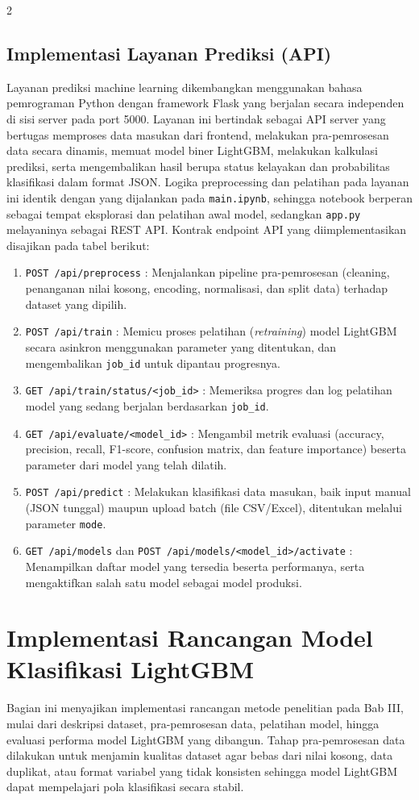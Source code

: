 \documentclass[12pt, a4paper, onecolumn, oneside]{report}
\begin{document}
\begin{spacing}{2}
\subsection{Implementasi Layanan Prediksi (API)}
Layanan prediksi machine learning dikembangkan menggunakan bahasa pemrograman Python dengan framework Flask yang berjalan secara independen di sisi server pada port 5000. Layanan ini bertindak sebagai API server yang bertugas memproses data masukan dari frontend, melakukan pra-pemrosesan data secara dinamis, memuat model biner LightGBM, melakukan kalkulasi prediksi, serta mengembalikan hasil berupa status kelayakan dan probabilitas klasifikasi dalam format JSON. Logika preprocessing dan pelatihan pada layanan ini identik dengan yang dijalankan pada \texttt{main.ipynb}, sehingga notebook berperan sebagai tempat eksplorasi dan pelatihan awal model, sedangkan \texttt{app.py} melayaninya sebagai REST API. Kontrak endpoint API yang diimplementasikan disajikan pada tabel berikut:
\begin{enumerate}
    \item \texttt{POST /api/preprocess} : Menjalankan pipeline pra-pemrosesan (cleaning, penanganan nilai kosong, encoding, normalisasi, dan split data) terhadap dataset yang dipilih.
    \item \texttt{POST /api/train} : Memicu proses pelatihan (\textit{retraining}) model LightGBM secara asinkron menggunakan parameter yang ditentukan, dan mengembalikan \texttt{job\_id} untuk dipantau progresnya.
    \item \texttt{GET /api/train/status/\allowbreak<job\_id>} : Memeriksa progres dan log pelatihan model yang sedang berjalan berdasarkan \texttt{job\_id}.
    \item \texttt{GET /api/evaluate/\allowbreak<model\_id>} : Mengambil metrik evaluasi (accuracy, precision, recall, F1-score, confusion matrix, dan feature importance) beserta parameter dari model yang telah dilatih.
    \item \texttt{POST /api/predict} : Melakukan klasifikasi data masukan, baik input manual (JSON tunggal) maupun upload batch (file CSV/Excel), ditentukan melalui parameter \texttt{mode}.
    \item \texttt{GET /api/models} dan \texttt{POST /api/models/\allowbreak<model\_id>/activate} : Menampilkan daftar model yang tersedia beserta performanya, serta mengaktifkan salah satu model sebagai model produksi.
\end{enumerate}

\section{Implementasi Rancangan Model Klasifikasi LightGBM}
Bagian ini menyajikan implementasi rancangan metode penelitian pada Bab III, mulai dari deskripsi dataset, pra-pemrosesan data, pelatihan model, hingga evaluasi performa model LightGBM yang dibangun. Tahap pra-pemrosesan data dilakukan untuk menjamin kualitas dataset agar bebas dari nilai kosong, data duplikat, atau format variabel yang tidak konsisten sehingga model LightGBM dapat mempelajari pola klasifikasi secara stabil.


\end{spacing}
\end{document}
